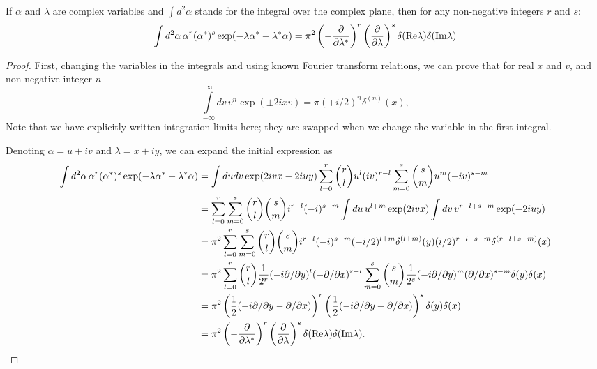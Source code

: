 \begin{lemma}
\label{lmm:formalism:c-numbers:fourier-of-moments}
If $\alpha$ and $\lambda$ are complex variables and $\int d^2\alpha$ stands for the integral over the complex plane, then for any non-negative integers $r$ and $s$:
\[
	\int d^2\alpha\, \alpha^r (\alpha^*)^s \exp(-\lambda \alpha^* + \lambda^* \alpha)
	= \pi^2
		\left( -\frac{\partial}{\partial \lambda^*} \right)^r
		\left( \frac{\partial}{\partial \lambda} \right)^s
		\delta(\mathrm{Re} \lambda) \delta(\mathrm{Im} \lambda)
\]
\end{lemma}
\begin{proof}
First, changing the variables in the integrals and using known Fourier transform relations, we can prove that for real $x$ and $v$, and non-negative integer $n$
\[
	\int\limits_{-\infty}^{\infty} dv\, v^n \exp(\pm 2 i x v)
	= \pi (\mp i / 2)^n \delta^{(n)}(x),
\]
Note that we have explicitly written integration limits here;
they are swapped when we change the variable in the first integral.

Denoting $\alpha = u + iv$ and $\lambda = x + iy$, we can expand the initial expression as
\begin{equation*}
\begin{split}
	\int d^2\alpha\, \alpha^r (\alpha^*)^s \exp(-\lambda \alpha^* + \lambda^* \alpha)
	& = \int du dv \exp(2ivx - 2iuy)
		\sum\limits_{l=0}^r \binom{r}{l} u^l (iv)^{r-l}
		\sum\limits_{m=0}^s \binom{s}{m} u^m (-iv)^{s-m} \\
	& = \sum\limits_{l=0}^r \sum\limits_{m=0}^s \binom{r}{l} \binom{s}{m}
		i^{r-l} (-i)^{s-m}
		\int du\, u^{l+m} \exp(2ivx)
		\int dv\, v^{r-l+s-m} \exp(-2iuy) \\
	& = \pi^2 \sum\limits_{l=0}^r \sum\limits_{m=0}^s \binom{r}{l} \binom{s}{m}
		i^{r-l} (-i)^{s-m}
		(-i/2)^{l+m} \delta^{(l+m)}(y)
		(i/2)^{r-l+s-m} \delta^{(r-l+s-m)}(x) \\
	& = \pi^2
		\sum\limits_{l=0}^r \binom{r}{l}
			\frac{1}{2^r}
			(-i \partial / \partial y)^l
			(-\partial / \partial x)^{r-l}
		\sum\limits_{m=0}^s \binom{s}{m}
			\frac{1}{2^s}
			(-i \partial / \partial y)^m
			(\partial / \partial x)^{s-m}
		\delta(y) \delta(x) \\
	& = \pi^2
		\left( \frac{1}{2} (-i \partial / \partial y - \partial / \partial x) \right)^r
		\left( \frac{1}{2} (-i \partial / \partial y + \partial / \partial x) \right)^s
		\delta(y) \delta(x) \\
	& = \pi^2
		\left( -\frac{\partial}{\partial \lambda^*} \right)^r
		\left( \frac{\partial}{\partial \lambda} \right)^s
		\delta(\mathrm{Re} \lambda) \delta(\mathrm{Im} \lambda).
		\qedhere
\end{split}
\end{equation*}
\end{proof}

